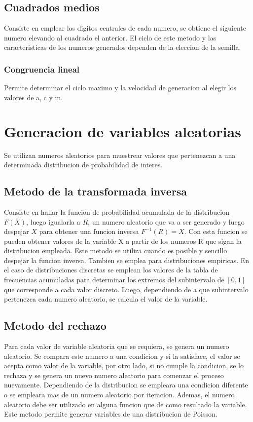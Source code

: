 \documentclass[a4paper]{article}
\begin{document}
\subsection*{Cuadrados medios}
Consiste en emplear los digitos centrales de cada numero, se obtiene el siguiente numero elevando al cuadrado
el anterior. El ciclo de este metodo y las caracteristicas de los numeros generados dependen de la eleccion de 
la semilla.

\subsubsection*{Congruencia lineal} 
Permite determinar el ciclo maximo y la velocidad de generacion al elegir los valores de a, c y m.

\section{Generacion de variables aleatorias}
Se utilizan numeros aleatorios para muestrear valores que pertenezcan a una determinada distribucion de
probabilidad de interes.

\subsection*{Metodo de la transformada inversa}
Consiste en hallar la funcion de probabilidad acumulada de la distribucion $F(X)$, luego igualarla a $R$,
un numero aleatorio que va a ser generado y luego despejar $X$ para obtener una funcion inversa $F^{-1}(R) = X$.
Con esta funcion se pueden obtener valores de la variable X a partir de los numeros R que sigan la distribucion 
empleada. 
Este metodo se utiliza cuando es posible y sencillo despejar la funcion inversa. Tambien se emplea para distribuciones
empiricas.
En el caso de distribuciones discretas se emplean los valores de la tabla de frecuencias acumuladas para determinar 
los extremos del subintervalo de $[0,1]$ que corresponde a cada valor discreto. Luego, dependiendo de a que subintervalo
pertenezca cada numero aleatorio, se calcula el valor de la variable.

\subsection*{Metodo del rechazo}
Para cada valor de variable aleatoria que se requiera, se genera un numero aleatorio. Se compara este numero a una condicion
y si la satisface, el valor se acepta como valor de la variable, por otro lado, si no cumple la condicion, se lo rechaza y
se genera un nuevo numero aleatorio para comenzar el proceso nuevamente. Dependiendo de la distribucion se empleara una 
condicion diferente o se empleara mas de un numero aleatorio por iteracion. Ademas, el numero aleatorio debe ser utilizado 
en alguna funcion que de como resultado la variable.
Este metodo permite generar variables de una distribucion de Poisson.
\end{document}
